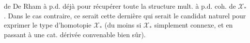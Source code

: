 
 de De Rham à p.d.   déjà pour récupérer toute la structure mult. à p.d. coh. de $\mathcal X_*$ . Dans le cas contraire, ce serait cette dernière qui serait le candidat  naturel pour exprimer le type d'homotopie $\mathcal X_*$ (du moins si $\mathcal X_*$  simplement connexe, et en passant à une cat. dérivée convenable bien sûr).

